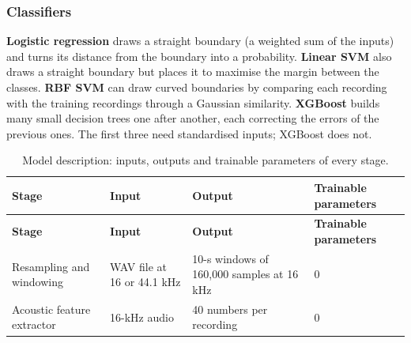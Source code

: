 \documentclass[11pt,a4paper]{article}
\begin{document}
\subsubsection{Classifiers}
\textbf{Logistic regression} draws a straight boundary (a weighted sum of the inputs) and turns its distance from the boundary into a probability. \textbf{Linear SVM} also draws a straight boundary but places it to maximise the margin between the classes. \textbf{RBF SVM} can draw curved boundaries by comparing each recording with the training recordings through a Gaussian similarity. \textbf{XGBoost} builds many small decision trees one after another, each correcting the errors of the previous ones. The first three need standardised inputs; XGBoost does not.

\begin{center}\small\renewcommand{\arraystretch}{1.15}
\begin{longtable}{>{\raggedright\arraybackslash}p{3.08cm}>{\raggedright\arraybackslash}p{4.04cm}>{\raggedright\arraybackslash}p{4.23cm}>{\raggedright\arraybackslash}p{3.46cm}}
\caption{Model description: inputs, outputs and trainable parameters of every stage.}\\
\toprule
\textbf{\hspace{0pt}Stage} & \textbf{\hspace{0pt}Input} & \textbf{\hspace{0pt}Output} & \textbf{\hspace{0pt}Trainable parameters}\\\midrule\endfirsthead
\toprule
\textbf{\hspace{0pt}Stage} & \textbf{\hspace{0pt}Input} & \textbf{\hspace{0pt}Output} & \textbf{\hspace{0pt}Trainable parameters}\\\midrule\endhead
\bottomrule\endfoot
\hspace{0pt}Resampling and windowing & \hspace{0pt}WAV file at 16 or 44.1 kHz & \hspace{0pt}10-s windows of 160,000 samples at 16 kHz & \hspace{0pt}0\\
\hspace{0pt}Acoustic feature extractor & \hspace{0pt}16-kHz audio & \hspace{0pt}40 numbers per recording & \hspace{0pt}0\\

\end{longtable}
\end{center}
\end{document}
